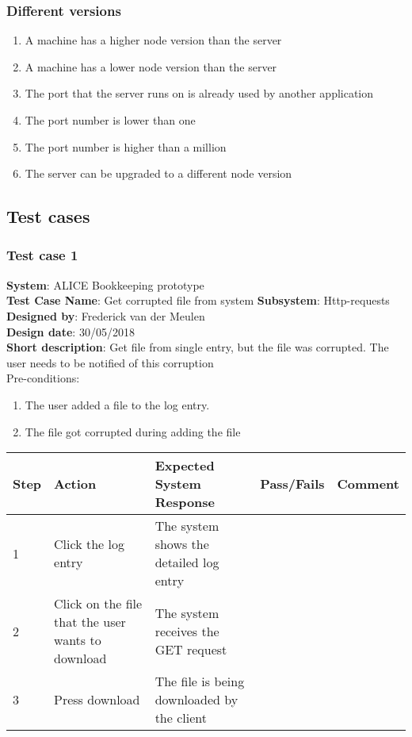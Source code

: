 \subsubsection{Different versions}
\begin{enumerate}
\item A machine has a higher node version than the server
\item A machine has a lower node version than the server
\item The port that the server runs on is already used by another application
\item The port number is lower than one
\item The port number is higher than a million
\item The server can be upgraded to a different node version
\end{enumerate}

\subsection{Test cases}

\subsubsection{Test case 1}
\textbf{System}:  ALICE Bookkeeping prototype \\
\textbf{Test Case Name}:  Get corrupted file from system
\textbf{Subsystem}:  Http-requests
\textbf{Designed by}:  Frederick van der Meulen\\
\textbf{Design date}: 30/05/2018 \\
\textbf{Short description}: Get file from single entry, but the file was corrupted. The user needs to be notified of this corruption \\

Pre-conditions: \\
\begin{enumerate}
\item The user added a file to the log entry.
\item The file got corrupted during adding the file
\end{enumerate}

\begin{longtable}{ | p{0.8cm} | p{4.5cm} | p{6cm} | p{1.5cm} | p{1.5cm} |}
\hline
Step & Action & Expected System Response & Pass/Fails & Comment \\ \hline
1 & Click the log entry & The system shows the detailed log entry & & \\ \hline
2 & Click on the file that the user wants to download & The system receives the GET request & & \\ \hline
3 & Press download & The file is being downloaded by the client & & \\ \hline
\end{longtable}
